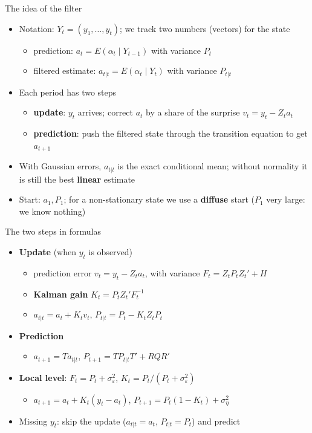 \begin{frame}{The idea of the filter}
\itemsize{\small}
\begin{itemize}
    \item Notation: $Y_t = (y_1, \dots, y_t)$; we track two numbers (vectors) for the state
    \begin{itemize}
        \item prediction: $a_t = E(\alpha_t \mid Y_{t-1})$ with variance $P_t$
        \item filtered estimate: $a_{t|t} = E(\alpha_t \mid Y_t)$ with variance $P_{t|t}$
    \end{itemize}
    \item Each period has two steps
    \begin{itemize}
        \item \textbf{update}: $y_t$ arrives; correct $a_t$ by a share of the surprise $v_t = y_t - Z_ta_t$
        \item \textbf{prediction}: push the filtered state through the transition equation to get $a_{t+1}$
    \end{itemize}
    \item With Gaussian errors, $a_{t|t}$ is the exact conditional mean; without normality it is still the best \textbf{linear} estimate 
    \item Start: $a_1, P_1$; for a non-stationary state we use a \textbf{diffuse} start ($P_1$ very large: we know nothing)
\end{itemize}
\end{frame}

\begin{frame}{The two steps in formulas}
\itemsize{\small}
\begin{itemize}
    \item \textbf{Update} (when $y_t$ is observed)
    \begin{itemize}
        \item prediction error $v_t = y_t - Z_ta_t$, with variance $F_t = Z_tP_tZ_t' + H$
        \item \textbf{Kalman gain} $K_t = P_tZ_t'F_t^{-1}$
        \item $a_{t|t} = a_t + K_tv_t$, \quad $P_{t|t} = P_t - K_tZ_tP_t$
    \end{itemize}
    \item \textbf{Prediction}
    \begin{itemize}
        \item $a_{t+1} = Ta_{t|t}$, \quad $P_{t+1} = TP_{t|t}T' + RQR'$
    \end{itemize}
    \item \textbf{Local level}: $F_t = P_t + \sigma^2_\varepsilon$, \quad $K_t = P_t/(P_t + \sigma^2_\varepsilon)$
    \begin{itemize}
        \item $a_{t+1} = a_t + K_t(y_t - a_t)$, \quad $P_{t+1} = P_t(1 - K_t) + \sigma^2_\eta$
    \end{itemize}
    \item Missing $y_t$: skip the update ($a_{t|t} = a_t$, $P_{t|t} = P_t$) and predict
\end{itemize}
\end{frame}

